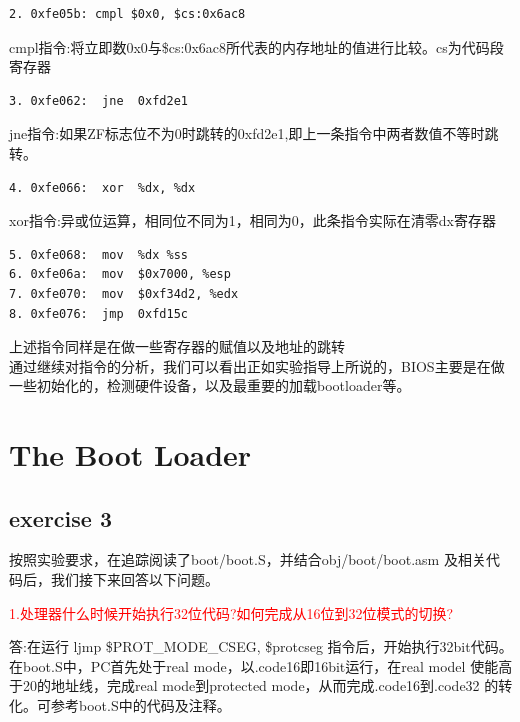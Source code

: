\documentclass[]{ctexrep}
\begin{document}
\begin{lstlisting}[language={[x86masm]Assembler}]
2. 0xfe05b: cmpl $0x0, $cs:0x6ac8
\end{lstlisting}
cmpl指令:将立即数0x0与\$cs:0x6ac8所代表的内存地址的值进行比较。cs为代码段寄存器
\begin{lstlisting}
3. 0xfe062:  jne  0xfd2e1
\end{lstlisting}
jne指令:如果ZF标志位不为0时跳转的0xfd2e1,即上一条指令中两者数值不等时跳转。
\begin{lstlisting}
4. 0xfe066:  xor  %dx, %dx
\end{lstlisting}
xor指令:异或位运算，相同位不同为1，相同为0，此条指令实际在清零dx寄存器
\begin{lstlisting}
5. 0xfe068:  mov  %dx %ss
6. 0xfe06a:  mov  $0x7000, %esp
7. 0xfe070:  mov  $0xf34d2, %edx
8. 0xfe076:  jmp  0xfd15c
\end{lstlisting}
上述指令同样是在做一些寄存器的赋值以及地址的跳转\\[0.3cm]

通过继续对指令的分析，我们可以看出正如实验指导上所说的，BIOS主要是在做一些初始化的，检测硬件设备，以及最重要的加载bootloader等。

\chapter{The Boot Loader}
\section{exercise 3}
按照实验要求，在追踪阅读了boot/boot.S，并结合obj/boot/boot.asm 及相关代码后，我们接下来回答以下问题。

\textcolor{red}{1.处理器什么时候开始执行32位代码?如何完成从16位到32位模式的切换?}\par
答:在运行 ljmp \$PROT\_MODE\_CSEG, \$protcseg 指令后，开始执行32bit代码。在boot.S中，PC首先处于real mode，以.code16即16bit运行，在real model 使能高于20的地址线，完成real mode到protected mode，从而完成.code16到.code32 的转化。可参考boot.S中的代码及注释。\par
\end{document}
